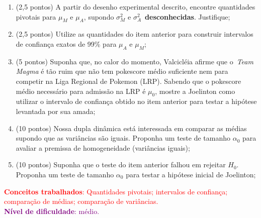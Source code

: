 \documentclass[a4paper,10pt, notitlepage]{report}
\begin{document}
\begin{enumerate}[label=\alph*)]
 \item (2,5 pontos) A partir do desenho experimental descrito, encontre quantidades pivotais para $\mu_M$ e $\mu_A$, supondo $\sigma_M^2$ e $\sigma_A^2$~\textbf{desconhecidas}. 
 Justifique;
 \item (2,5 pontos) Utilize as quantidades do item anterior para construir intervalos de confiança exatos de 99\% para $\mu_A$ e $\mu_M$;
  \item (5 pontos) Suponha que, no calor do momento, Valcicléia afirme que o~\textit{Team Magma} é tão ruim que não tem pokescore médio suficiente nem para competir na Liga Regional de Pokemon (LRP).
  Sabendo que o pokescore médio necessário para admissão na LRP é $\mu_0$, mostre a Joelinton como utilizar o intervalo de confiança obtido no item anterior para testar a hipótese levantada por sua amada;
 \item (10 pontos) Nossa dupla dinâmica está interessada em comparar as médias supondo que as variâncias são iguais.
 Proponha um teste de tamanho $\alpha_0$ para avaliar a premissa de homogeneidade (variâncias iguais);
 \item (10 pontos) Suponha que o teste do item anterior falhou em rejeitar $H_0$.
 Proponha um teste de tamanho $\alpha_0$ para testar a hipótese inicial de Joelinton;
\end{enumerate}
\textcolor{red}{\textbf{Conceitos trabalhados}: Quantidades pivotais; intervalos de confiança; comparação de médias; comparação de variâncias.}\\
\textcolor{purple}{\textbf{Nível de dificuldade}: médio.}\\
\end{document}
